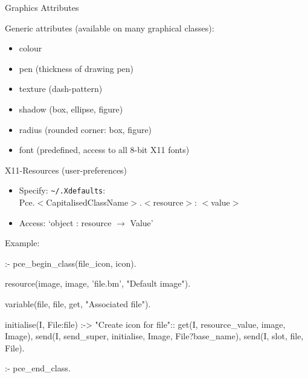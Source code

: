 \begin{sli}{Graphics Attributes}

Generic attributes (available on many graphical classes):

\begin{itemize}
    \item colour
    \item pen (thickness of drawing pen)
    \item texture (dash-pattern)
    \item shadow (box, ellipse, figure)
    \item radius (rounded corner: box, figure)
    \item font (predefined, access to all 8-bit X11 fonts)
\end{itemize}
\end{sli}


\begin{sli}{X11-Resources (user-preferences)}

\begin{itemize}
    \item Specify: \verb$~/.Xdefaults$:\hfill\\
          Pce.$<$CapitalisedClassName$>$.$<$resource$>$: $<$value$>$
    \item Access: `object : resource $\longrightarrow$ Value'
\end{itemize}

Example:

\begin{code}
:- pce_begin_class(file_icon, icon).

resource(image, image, 'file.bm', "Default image").

variable(file, file, get, "Associated file").

initialise(I, File:file) :->
        "Create icon for file"::
        get(I, resource_value, image, Image),
        send(I, send_super, initialise,
             Image, File?base_name),
        send(I, slot, file, File).

:- pce_end_class.
\end{code}

\noindent
\end{sli}



